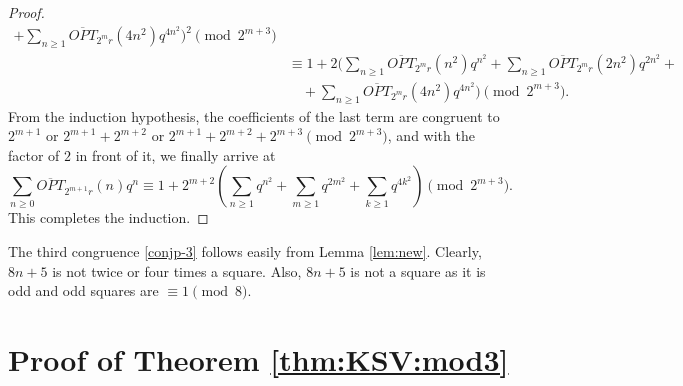 \documentclass[12pt,reqno]{amsart}
\numberwithin{equation}{section}
\newcommand{\opt}{\overline{OPT}}
\begin{document}
\begin{proof}
\begin{align*}
        + \sum_{n\geq 1}\opt_{2^mr}(4n^2)q^{4n^2}\Biggl)^2 \pmod{2^{m+3}}\\
       &\equiv 1+2\Biggl(\sum_{n\geq 1}\opt_{2^mr}(n^2)q^{n^2}+\sum_{n\geq 1}\opt_{2^mr}(2n^2)q^{2n^2}+\\
       & \quad +\sum_{n\geq 1}\opt_{2^mr}(4n^2)q^{4n^2}\Biggl) \pmod{2^{m+3}}.
    \end{align*}
    From the induction hypothesis, the coefficients of the last term are congruent to $2^{m+1}$ or $2^{m+1}+2^{m+2}$ or $2^{m+1}+2^{m+2}+2^{m+3} \pmod{2^{m+3}}$, and with the factor of $2$ in front of it, we finally arrive at
    \begin{equation}
         \sum_{n\geq 0}\opt_{2^{m+1}r}(n)q^n\equiv 1+2^{m+2}\left(\sum_{n\geq 1}q^{n^2}+\sum_{m\geq 1}q^{2m^2}+\sum_{k\geq 1}q^{4k^2}\right) \pmod{2^{m+3}}.
    \end{equation}
    This completes the induction.
\end{proof}

The third congruence \eqref{conjp-3} follows easily from Lemma \ref{lem:new}. Clearly, $8n+5$ is not twice or four times a square.  Also, $8n+5$ is not a square as it is odd and odd squares are $\equiv 1 \pmod 8$.



\section{Proof of Theorem \ref{thm:KSV:mod3}}\label{sec:KSV:mod3}
\end{document}
